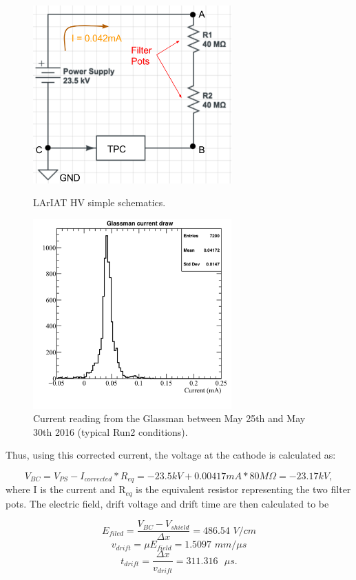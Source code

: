 \begin{figure}[hp]
\centering
\begin{minipage}{0.45\textwidth}
\centering
\includegraphics[width=3in]{images/CircuitLArIAT.png}
\caption{LArIAT HV simple schematics.}
\label{fig:circuit}
\end{minipage}\hfill
\begin{minipage}{0.45\textwidth}
\centering
\includegraphics[width=3in]{images/glassman_current_20160525-30.png}
\caption{Current reading from the Glassman between May 25th and May 30th 2016 (typical Run2 conditions).}
\label{fig:currentMeasurement}
\end{minipage}
\end{figure}

Thus, using this corrected current, the voltage at the cathode is calculated as:

\begin{equation} V_{BC}=V_{PS} - I_{corrected}*R_{eq} = -23.5kV + 0.00417mA*80M\Omega = -23.17 kV, \label{eq:VBC}
\end{equation}
where I is the current and R$_{eq}$ is the equivalent resistor representing the two filter pots. The electric field, drift voltage and drift time are then calculated to be

\begin{equation}E_{filed} = \frac{V_{BC} - V_{shield}}{\Delta x} = 486.54 \textit{ V/cm}
\end{equation}
\begin{equation}v_{drift} = \mu E_{field} = 1.5097 \textit{ mm/$\mu$s}
\end{equation}
\begin{equation}t_{drift} = \frac{\Delta x}{v_{drift}} = 311.316 \textit{ $\mu$s.}
\end{equation}


